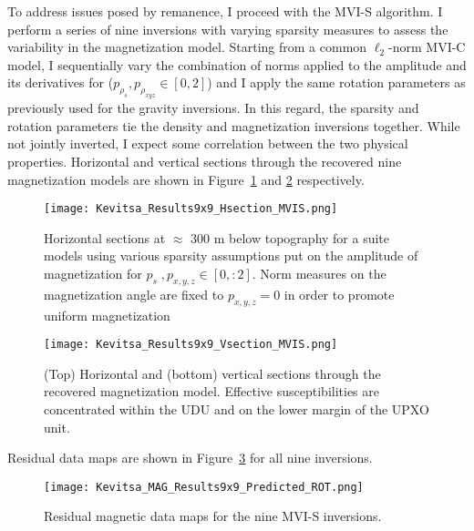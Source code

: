 To address issues posed by remanence, I proceed with the MVI-S algorithm.
I perform a series of nine inversions with varying sparsity measures to assess the variability in the magnetization model. Starting from a common $\ell_2$-norm MVI-C model, I sequentially vary the combination of norms applied to the amplitude and its derivatives for ($p_{\rho_s}, p_{\rho_{xyz}} \in [0, 2]$) and I apply the same rotation parameters as previously used for the gravity inversions. In this regard, the sparsity and rotation parameters tie the density and magnetization inversions together. While not jointly inverted, I expect some correlation between the two physical properties.
Horizontal and vertical sections through the recovered nine magnetization models are shown in Figure~\ref{MVIS_Hsections} and \ref{MVIS_Vsections} respectively.
\begin{figure}[h!]
\texttt{[image: Kevitsa\_Results9x9\_Hsection\_MVIS.png]}
\caption{Horizontal sections at $\approx$ 300 m below topography for a suite models using various sparsity assumptions put on the amplitude of magnetization for $p_s\;, p_{x,y,z} \in [0,:2]$. Norm measures on the magnetization angle are fixed to $p_{x,y,z}=0$ in order to promote uniform magnetization}
\label{MVIS_Hsections}
\end{figure}
\begin{figure}[h!]
\texttt{[image: Kevitsa\_Results9x9\_Vsection\_MVIS.png]}
\caption{(Top) Horizontal and (bottom) vertical sections through the recovered magnetization model. Effective susceptibilities are concentrated within the UDU and on the lower margin of the UPXO unit.}
\label{MVIS_Vsections}
\end{figure}
Residual data maps are shown in Figure~\ref{Kevitsa_MAG_Results9x9_Predicted} for all nine inversions.
\begin{figure}
\texttt{[image: Kevitsa\_MAG\_Results9x9\_Predicted\_ROT.png]}
\caption{Residual magnetic data maps for the nine MVI-S inversions.}
\label{Kevitsa_MAG_Results9x9_Predicted}
\end{figure}


